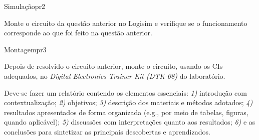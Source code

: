 \begin{problem}{Simulação}{pr2}

Monte o circuito da questão anterior no Logisim e verifique se o funcionamento corresponde ao que foi feito na questão anterior. \\

\end{problem}

\begin{problem}{Montagem}{pr3}
    
Depois de resolvido o circuito anterior, monte o circuito, usando os CIs adequados, no \textit{Digital Electronics Trainer Kit (DTK-08)} do laboratório.

\end{problem}

\begin{obs}

Deve-se fazer um relatório contendo os elementos essenciais: \textit{1)} introdução com contextualização; \textit{2)} objetivos; \textit{3)} descrição dos materiais e métodos adotados; \textit{4)} resultados apresentados de forma organizada (e.g., por meio de tabelas, figuras, quando aplicável); \textit{5)} discussões com interpretações quanto aos resultados; \textit{6)} e as conclusões para sintetizar as principais descobertas e aprendizados.

\end{obs}

\newpage

\printbibliography


